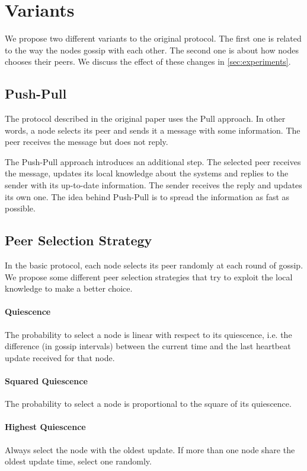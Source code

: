 \section{Variants}
\label{sec:variants}

We propose two different variants to the original protocol.
The first one is related to the way the nodes gossip with each other.
The second one is about how nodes chooses their peers.
We discuss the effect of these changes in \cref{sec:experiments}.


\subsection{Push-Pull}
The protocol described in the original paper uses the Pull approach.
In other words, a node selects its peer and sends it a message with some information.
The peer receives the message but does not reply.

The Push-Pull approach introduces an additional step.
The selected peer receives the message, updates its local knowledge about the systems and replies to the sender with its up-to-date information.
The sender receives the reply and updates its own one.
The idea behind Push-Pull is to spread the information as fast as possible.


\subsection{Peer Selection Strategy}
In the basic protocol, each node selects its peer randomly at each round of gossip.
We propose some different peer selection strategies that try to exploit the local knowledge to make a better choice.

\paragraph*{Quiescence}
The probability to select a node is linear with respect to its quiescence, i.e. the difference (in gossip intervals) between the current time and the last heartbeat update received for that node.

\paragraph*{Squared Quiescence}
The probability to select a node is proportional to the square of its quiescence.

\paragraph*{Highest Quiescence}
Always select the node with the oldest update.
If more than one node share the oldest update time, select one randomly.
